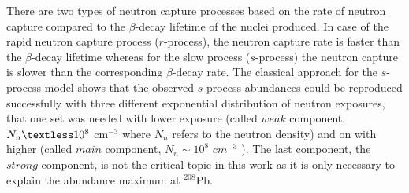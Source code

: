 There are two types of neutron capture processes based on the rate of neutron capture compared to the $\beta$-decay lifetime of the nuclei produced. In case of the rapid neutron capture process ($r$-process), the neutron capture rate is faster than the $\beta$-decay lifetime whereas for the slow process ($s$-process) the neutron capture is slower than the corresponding $\beta$-decay rate.
The classical approach for the $s$-process model shows that the observed $s$-process abundances
could be reproduced successfully with three different exponential distribution of neutron exposures, that one set was needed with lower exposure (called $weak$ component,  $N_n \textless 10^8$ cm$^{-3}$ where $N_n$ refers to the neutron density) and on with higher (called $main$ component, $N_n \sim 10^8$ $cm^{-3}$ ). The last component, the $strong$ component, is not the critical topic in this work as it is only necessary to explain the abundance maximum at $^{208}$Pb.~\citep{Kappeler1989}%


